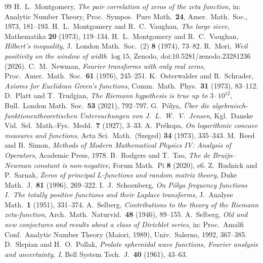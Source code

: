 \documentclass[11pt]{amsart}
\theoremstyle{definition}
\theoremstyle{remark}
\numberwithin{equation}{section}
\begin{document}
\begin{thebibliography}{99}
 H.~L.~Montgomery, \emph{The pair correlation of zeros of the zeta function}, in: Analytic Number Theory, Proc.\ Sympos.\ Pure Math.\ \textbf{24}, Amer.\ Math.\ Soc., 1973, 181--193.
 H.~L.~Montgomery and R.~C.~Vaughan, \emph{The large sieve}, Mathematika \textbf{20} (1973), 119--134.
 H.~L.~Montgomery and R.~C.~Vaughan, \emph{Hilbert's inequality}, J.\ London Math.\ Soc.\ (2) \textbf{8} (1974), 73--82.
 R.~Mori, \emph{Weil positivity on the window of width $\log 15$}, Zenodo, doi:10.5281/zenodo.23281236 (2026).
 C.~M.~Newman, \emph{Fourier transforms with only real zeros}, Proc.\ Amer.\ Math.\ Soc.\ \textbf{61} (1976), 245--251.
 K.~Osterwalder and R.~Schrader, \emph{Axioms for Euclidean Green's functions}, Comm.\ Math.\ Phys.\ \textbf{31} (1973), 83--112.
 D.~Platt and T.~Trudgian, \emph{The Riemann hypothesis is true up to $3\cdot10^{12}$}, Bull.\ London Math.\ Soc.\ \textbf{53} (2021), 792--797.
 G.~P\'olya, \emph{\"Uber die algebraisch-funktionentheoretischen Untersuchungen von J.~L.~W.~V.~Jensen}, Kgl.\ Danske Vid.\ Sel.\ Math.-Fys.\ Medd.\ \textbf{7} (1927), 3--33.
 A.~Pr\'ekopa, \emph{On logarithmic concave measures and functions}, Acta Sci.\ Math.\ (Szeged) \textbf{34} (1973), 335--343.
 M.~Reed and B.~Simon, \emph{Methods of Modern Mathematical Physics IV: Analysis of Operators}, Academic Press, 1978.
 B.~Rodgers and T.~Tao, \emph{The de Bruijn--Newman constant is non-negative}, Forum Math.\ Pi \textbf{8} (2020), e6.
 Z.~Rudnick and P.~Sarnak, \emph{Zeros of principal $L$-functions and random matrix theory}, Duke Math.\ J.\ \textbf{81} (1996), 269--322.
 I.~J.~Schoenberg, \emph{On P\'olya frequency functions I.\ The totally positive functions and their Laplace transforms}, J.\ Analyse Math.\ \textbf{1} (1951), 331--374.
 A.~Selberg, \emph{Contributions to the theory of the Riemann zeta-function}, Arch.\ Math.\ Naturvid.\ \textbf{48} (1946), 89--155.
 A.~Selberg, \emph{Old and new conjectures and results about a class of Dirichlet series}, in: Proc.\ Amalfi Conf.\ Analytic Number Theory (Maiori, 1989), Univ.\ Salerno, 1992, 367--385.
 D.~Slepian and H.~O.~Pollak, \emph{Prolate spheroidal wave functions, Fourier analysis and uncertainty, I}, Bell System Tech.\ J.\ \textbf{40} (1961), 43--63.

\end{thebibliography}
\end{document}
